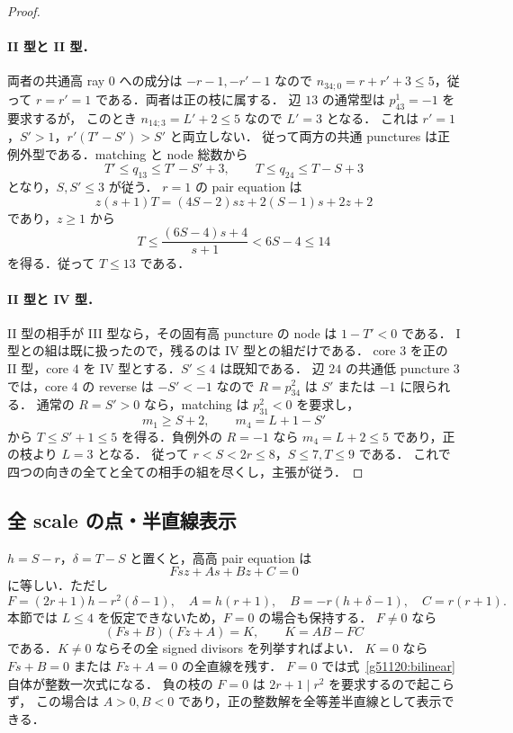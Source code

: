 \begin{proof}
\paragraph{II 型と II 型．}
両者の共通高 ray $0$ への成分は $-r-1,-r'-1$ なので
$n_{34;0}=r+r'+3\le5$，従って $r=r'=1$ である．両者は正の枝に属する．
辺 $13$ の通常型は $p^1_{43}=-1$ を要求するが，
このとき $n_{14;3}=L'+2\le5$ なので $L'=3$ となる．
これは $r'=1$，$S'>1$，$r'(T'-S')>S'$ と両立しない．
従って両方の共通 punctures は正例外型である．matching と node 総数から
\[
 T'\le q_{13}\le T'-S'+3,\qquad
 T\le q_{24}\le T-S+3
\]
となり，$S,S'\le3$ が従う．
$r=1$ の pair equation は
\[
 z(s+1)T=(4S-2)sz+2(S-1)s+2z+2
\]
であり，$z\ge1$ から
\[
 T\le\frac{(6S-4)s+4}{s+1}<6S-4\le14
\]
を得る．従って $T\le13$ である．

\paragraph{II 型と IV 型．}
II 型の相手が III 型なら，その固有高 puncture の node は $1-T'<0$ である．
I 型との組は既に扱ったので，残るのは IV 型との組だけである．
core $3$ を正の II 型，core $4$ を IV 型とする．$S'\le4$ は既知である．
辺 $24$ の共通低 puncture $3$ では，core $4$ の reverse は $-S'<-1$ なので
$R=p^2_{34}$ は $S'$ または $-1$ に限られる．
通常の $R=S'>0$ なら，matching は $p^2_{31}<0$ を要求し，
\[
 m_1\ge S+2,\qquad m_4=L+1-S'
\]
から $T\le S'+1\le5$ を得る．負例外の $R=-1$ なら
$m_4=L+2\le5$ であり，正の枝より $L=3$ となる．
従って $r<S<2r\le8$，$S\le7,T\le9$ である．
これで四つの向きの全てと全ての相手の組を尽くし，主張が従う．
\end{proof}

\subsection{全 scale の点・半直線表示}

$h=S-r$，$\delta=T-S$ と置くと，高高 pair equation は
\begin{equation}\label{g51120:bilinear}
 Fsz+As+Bz+C=0
\end{equation}
に等しい．ただし
\[
 F=(2r+1)h-r^2(\delta-1),\quad A=h(r+1),\quad
 B=-r(h+\delta-1),\quad C=r(r+1).
\]
本節では $L\le4$ を仮定できないため，$F=0$ の場合も保持する．
$F\ne0$ なら
\begin{equation}\label{g51120:factor}
 (Fs+B)(Fz+A)=K,\qquad K=AB-FC
\end{equation}
である．$K\ne0$ ならその全 signed divisors を列挙すればよい．
$K=0$ なら $Fs+B=0$ または $Fz+A=0$ の全直線を残す．
$F=0$ では式~\eqref{g51120:bilinear} 自体が整数一次式になる．
負の枝の $F=0$ は $2r+1\mid r^2$ を要求するので起こらず，
この場合は $A>0,B<0$ であり，正の整数解を全等差半直線として表示できる．

